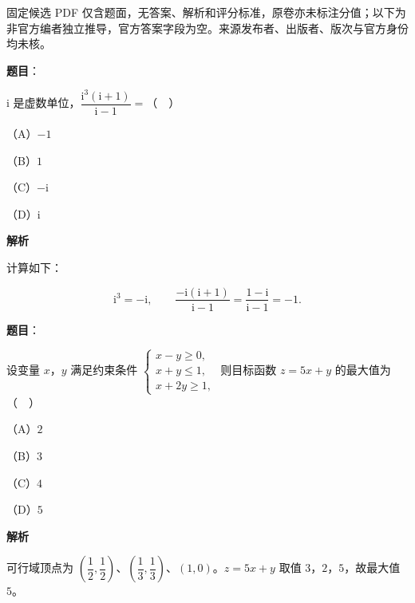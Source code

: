 

\begin{gktip}
固定候选 PDF 仅含题面，无答案、解析和评分标准，原卷亦未标注分值；以下为非官方编者独立推导，官方答案字段为空。来源发布者、出版者、版次与官方身份均未核。
\end{gktip}

\begin{answer}

\textbf{题目}：

$\mathrm i$ 是虚数单位，$\dfrac{\mathrm i^3(\mathrm i+1)}{\mathrm i-1}=$（　）

（A）$-1$

（B）$1$

（C）$-\mathrm i$

（D）$\mathrm i$

\textbf{解析}

计算如下：

\nopagebreak[4]
\[\mathrm i^3=-\mathrm i,\qquad \frac{-\mathrm i(\mathrm i+1)}{\mathrm i-1}=\frac{1-\mathrm i}{\mathrm i-1}=-1.\]


\end{answer}
\begin{answer}

\textbf{题目}：

设变量 $x$，$y$ 满足约束条件 $\begin{cases}x-y\geqslant0,\\ x+y\leqslant1,\\ x+2y\geqslant1,\end{cases}$ 则目标函数 $z=5x+y$ 的最大值为（　）

（A）$2$

（B）$3$

（C）$4$

（D）$5$

\textbf{解析}

可行域顶点为 $\left(\dfrac12,\dfrac12\right)$、$\left(\dfrac13,\dfrac13\right)$、$(1,0)$。$z=5x+y$ 取值 $3$，$2$，$5$，故最大值 $5$。


\end{answer}
